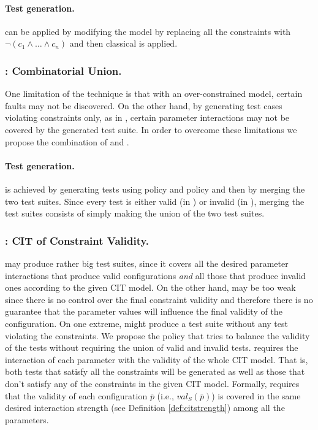 \begin{tikzborder}{\cite{Gargantini16:validation}}
	\paragraph*{Test generation.} \cv can be applied by modifying the model by replacing all the constraints with $\neg(c_{1}\wedge \dots\wedge c_{n})$ and then classical \ccit is applied.
	
	\subsubsection{\cucv: Combinatorial Union.}
	One limitation of the \ccit technique is that with an over-constrained model, certain faults may not be discovered. On the other hand, by generating test cases violating constraints only, as in \cv, certain parameter interactions may not be covered by the generated test suite. In order to overcome these limitations we propose the combination of \ccit and \cv. %
	
	\paragraph*{Test generation.}
	\cucv is achieved by generating tests using policy \ccit and policy \cv and then by merging the two test suites. Since every test is either valid (in \ccit) or invalid (in \cv), merging the test suites consists of simply making the union of the two test suites.
	
	\subsubsection{\ValC: CIT of Constraint Validity.}
	\cucv may produce rather big test suites, since it covers all the desired parameter interactions that produce valid configurations \emph{and} all those that produce invalid ones according to the given CIT model. On the other hand, \ic may be too weak since there is no control over the final constraint validity and therefore there is no guarantee that the parameter values will influence the final validity of the configuration. On one extreme, \ic might produce a test suite without any test violating the constraints. 
	We propose the \ValC policy that tries to balance the validity of the tests without requiring the union of valid and invalid tests. \ValC requires the interaction of each parameter with the validity of the whole CIT model. That is, both tests that satisfy all the constraints will be generated as well as those that don't satisfy any of the constraints in the given CIT model. 
	Formally, \ValC requires that the validity of each configuration $\bar{p}$ (i.e., $val_{S}(\bar{p})$) is covered in the same desired interaction strength (see Definition \ref{def:citstrength}) among all the parameters. %
	

\end{tikzborder}
